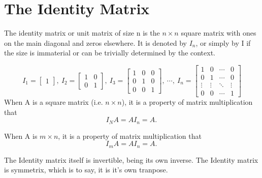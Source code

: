 \documentclass[]{article}
\begin{document}
\section*{The Identity Matrix }

The identity matrix or unit matrix of size n is the $n\times n$  square matrix with ones on the main diagonal and zeros elsewhere. It is denoted by $I_n$, or simply by I if the size is immaterial or can be trivially determined by the context. 

\[
I_{1}={\begin{bmatrix}1\end{bmatrix}},\ I_{2}={\begin{bmatrix}1&0\\0&1\end{bmatrix}},\ I_{3}={\begin{bmatrix}1&0&0\\0&1&0\\0&0&1\end{bmatrix}},\ \cdots ,\ I_{n}={\begin{bmatrix}1&0&\cdots &0\\0&1&\cdots &0\\\vdots &\vdots &\ddots &\vdots \\0&0&\cdots &1\end{bmatrix}}
\]
\newline
\noindent When A is a square matrix (i.e. $n\times n$), it is a property of matrix multiplication that
\[I_{N}A=AI_{n}=A.\,\]
\newline

\noindent When A is $m\times n$, it is a property of matrix multiplication that
\[I_{m}A=AI_{n}=A.\,\]

The Identity matrix itself is invertible, being its own inverse.
The Identity matrix is symmetrix, which is to say, it is it's own tranpose.
\end{document}
